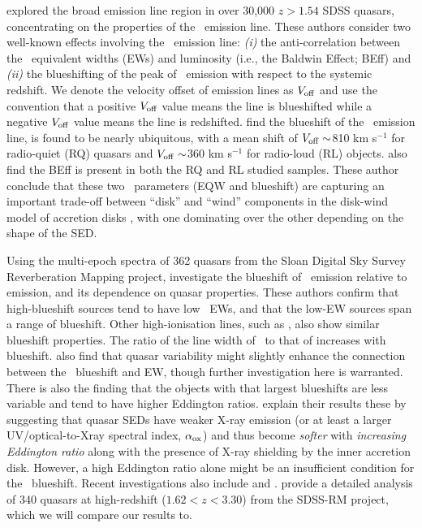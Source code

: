 \documentclass[fleqn,usenatbib]{mnras}
\begin{document}
\citet{Richards2011} explored the broad emission line region in over 30,000 $z > 1.54$
SDSS quasars, concentrating on the properties of the \civ\ emission
line. These authors consider two well-known effects involving the
\civ\ emission line: {\it (i)} the anti-correlation between the \civ\
equivalent widths (EWs) and luminosity (i.e., the Baldwin Effect;
BEff) and {\it (ii)} the blueshifting of the peak of \civ\ emission
with respect to the systemic redshift.  We denote the velocity offset
of emission lines as $V_{\rm off}$ and use the convention that a
positive $V_{\rm off}$ value means the line is blueshifted while a
negative $V_{\rm off}$ value means the line is redshifted.
\citet{Richards2011} find the blueshift of the \civ\ emission line, is
found to be nearly ubiquitous, with a mean shift of $V_{\rm off}
\sim$810 km s$^{-1}$ for radio-quiet (RQ) quasars and $V_{\rm off}
\sim$360 km s$^{-1}$ for radio-loud (RL) objects. \citet{Richards2011}
also find the BEff is present in both the RQ and RL studied samples.
These author conclude that these two \civ\ parameters (EQW and
blueshift) are capturing an important trade-off between ``disk'' and
``wind'' components in the disk-wind model of accretion disks
\citep[e.g.,][]{Murray1995, Elvis2000, Proga2000, Leighly2004b}, with
one dominating over the other depending on the shape of the SED.

Using the multi-epoch spectra of 362 quasars from the Sloan Digital
Sky Survey Reverberation Mapping \citep[SDSS-RM; ][]{Shen2015,
Shen2019} project, \citet{Sun2018} investigate the blueshift of \civ\
emission relative to \mgii emission, and its dependence on quasar
properties. These authors confirm that high-blueshift sources tend to
have low \civ\ EWs, and that the low-EW sources span a range of
blueshift. Other high-ionisation lines, such as \heii, also show
similar blueshift properties. The ratio of the line width of \civ\ to
that of \mgii increases with blueshift. \citet{Sun2018} also find that
quasar variability might slightly enhance the connection between the
\civ\ blueshift and EW, though further investigation here is
warranted. There is also the finding that the objects with that
largest blueshifts are less variable and tend to have higher Eddington
ratios. \citet{Sun2018} explain their results these by suggesting that
quasar SEDs have weaker X-ray emission (or at least a larger UV/optical-to-Xray
spectral index, $\alpha_{\rm ox}$) and thus become {\it
softer} with {\it increasing Eddington ratio} along with the presence
of X-ray shielding by the inner accretion disk. However, a high
Eddington ratio alone might be an insufficient condition for the \civ\
blueshift. Recent investigations also include \citet{Meyer2019} and
\citet{Doan2019}. \citet{Dyer2019} provide a detailed analysis of 340
quasars at high-redshift ($1.62<z<3.30$) from the SDSS-RM project,
which we will compare our results to.
\end{document}

